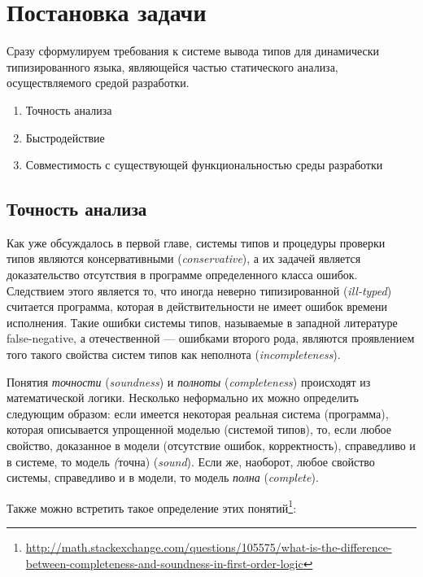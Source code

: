 \chapter{Постановка задачи}

Сразу сформулируем требования к системе вывода типов для динамически
типизированного языка, являющейся частью статического анализа, осуществляемого
средой разработки.

\begin{enumerate}
    \item{Точность анализа}
    \item{Быстродействие}
    \item{Совместимость с существующей функциональностью среды разработки}
\end{enumerate}

\section{Точность анализа}
\label{sec:precision-requirement}

Как уже обсуждалось в первой главе, системы типов и процедуры проверки типов
являются консервативными (\emph{conservative}), а их задачей является
доказательство отсутствия в программе определенного класса ошибок. Следствием
этого является то, что иногда неверно типизированной (\emph{ill-typed})
считается программа, которая в действительности не имеет ошибок времени
исполнения. Такие ошибки системы типов, называемые в западной литературе
false-negative, а отечественной --- ошибками второго рода, являются проявлением
того такого свойства систем типов как неполнота (\emph{incompleteness}). 

Понятия \emph{точности} (\emph{soundness}) и \emph{полноты}
(\emph{completeness}) происходят из математической логики. Несколько неформально
их можно определить следующим образом: если имеется некоторая реальная система
(программа), которая описывается упрощенной моделью (системой типов), то, если
любое свойство, доказанное в модели (отсутствие ошибок, корректность),
справедливо и в системе, то модель \emph(точна) (\emph{sound}).  Если же,
наоборот, любое свойство системы, справедливо и в модели, то модель \emph{полна}
(\emph{complete}).

Также можно встретить такое определение этих
понятий\footnote{\url{http://math.stackexchange.com/questions/105575/what-is-the-difference-between-completeness-and-soundness-in-first-order-logic}}:

